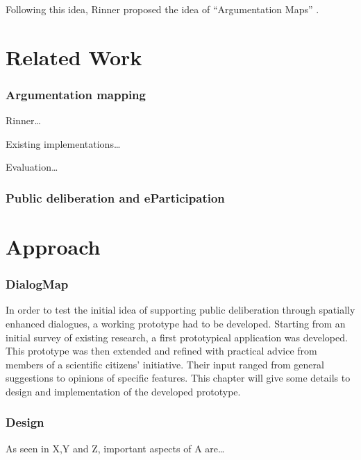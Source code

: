 \documentclass{sigchi}
\begin{document}
Following this idea, Rinner proposed the idea of ``Argumentation Maps'' \cite{Rinner_ArgumentationMaps}. 


\section{Related Work}

\subsubsection{Argumentation mapping}
Rinner\cite{Rinner_ArgumentationMaps}\dots

Existing implementations\dots

Evaluation\dots
\subsubsection{Public deliberation and eParticipation}


\section{Approach}



\subsubsection{DialogMap}

In order to test the initial idea of supporting public deliberation through spatially enhanced dialogues, a working prototype had to be developed. Starting from an initial survey of existing research, a first prototypical application was developed. This prototype was then extended and refined with practical advice from members of a scientific citizens' initiative. Their input ranged from general suggestions to opinions of specific features. This chapter will give some details to design and implementation of the developed prototype.


\subsubsection{Design} %

As seen in X,Y and Z, important aspects of A are\dots
\end{document}
